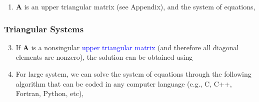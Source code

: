 \documentclass[10pt,compress]{beamer}
\begin{document}
\begin{frame}
\begin{enumerate}
{}
    \item <2-> $\bm{A}$ is an upper triangular matrix (see Appendix), and  the system of equations, 
% 
  \end{enumerate}
\end{frame}

\begin{frame}
  \frametitle{Triangular Systems} 
  \begin{enumerate}
  \setcounter{enumi}{2}
    \item <1-> If $\bm{A}$ is a nonsingular \textcolor{blue}{upper triangular matrix} (and therefore all diagonal elements are nonzero), the solution can be obtained using
    \item <3-> For large system, we can solve the system of equations through the following algorithm that can be coded in any computer language (e.g., C, C++, Fortran, Python, etc),
  \end{enumerate}
\end{frame}
\end{document}
